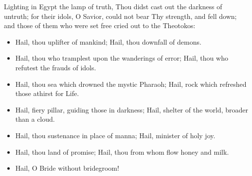 \documentclass[twoside, letterpaper, 12pt]{report}
\begin{document}





\begin{reader}
  \item Lighting in Egypt the lamp of truth, Thou didst cast out the darkness of untruth;
  for their idols, O Savior, could not bear Thy strength, and fell down; and those of them
  who were set free cried out to the Theotokos:
\end{reader}

\begin{itemize}[label=\tiny{+},leftmargin=*]
\item Hail, thou uplifter of mankind;
      Hail, thou downfall of demons.
\item Hail, thou who tramplest upon the wanderings of error;
      Hail, thou who refutest the frauds of idols.
\item Hail, thou sea which drowned the mystic Pharaoh;
      Hail, rock which refreshed those athirst for Life.
\item Hail, fiery pillar, guiding those in darkness;
      Hail, shelter of the world, broader than a cloud.
\item Hail, thou sustenance in place of manna;
      Hail, minister of holy joy.
\item Hail, thou land of promise;
      Hail, thou from whom flow honey and milk. 
\item Hail, O Bride without bridegroom! 
\end{itemize}




\end{document}

